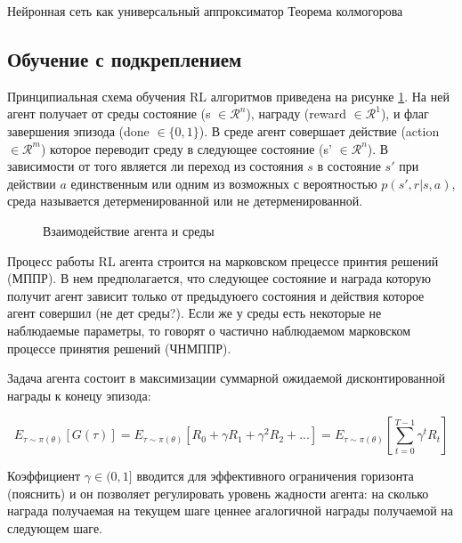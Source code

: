 Нейронная сеть как универсальный аппроксиматор
Теорема колмогорова


\subsection{Обучение с подкреплением}

Принципиальная схема обучения RL алгоритмов приведена на рисунке \ref{fig:rl}. На ней агент получает от среды состояние (s $\in \mathcal{R}^n$), награду (reward $\in \mathcal{R}^1$), и флаг завершения эпизода (done $\in \{0, 1\}$).  В среде агент совершает действие (action $\in \mathcal{R}^m$) которое переводит среду в следующее состояние (s' $\in \mathcal{R}^n$). В зависимости от того является ли переход из состояния $s$ в состояние $s'$ при действии $a$ единственным или одним из возможных с вероятностью $p(s',r|s,a)$, среда называется детерменированной или не детерменированной. 

\begin{figure}[ht]
	\caption{Взаимодействие агента и среды}
	\label{fig:rl}
\end{figure}

Процесс работы RL агента строится на марковском прецессе принтия решений (МППР). В нем предполагается, что следующее состояние и награда которую получит агент зависит только от предыдуюего состояния и действия которое агент совершил (не дет среды?). Если же у среды есть некоторые не наблюдаемые параметры, то говорят о частично наблюдаемом марковском процессе принятия решений (ЧНМППР). 

Задача агента состоит в максимизации суммарной ожидаемой дисконтированной награды к конецу эпизода:

\begin{equation}
E_{\tau \sim \pi(\theta)} [G(\tau)] = E_{\tau \sim \pi(\theta)} [R_0 + \gamma R_{1} + \gamma ^ 2 R_{2} + ...] = E_{\tau \sim \pi(\theta)} [\sum_{t=0}^{T - 1} \gamma ^t R_{t}]
\end{equation}

Коэффициент $\gamma \in (0, 1]$ вводится для эффективного ограничения горизонта (пояснить) и он позволяет регулировать уровень жадности агента: на сколько награда получаемая на текущем шаге ценнее агалогичной награды получаемой на следующем шаге.  


